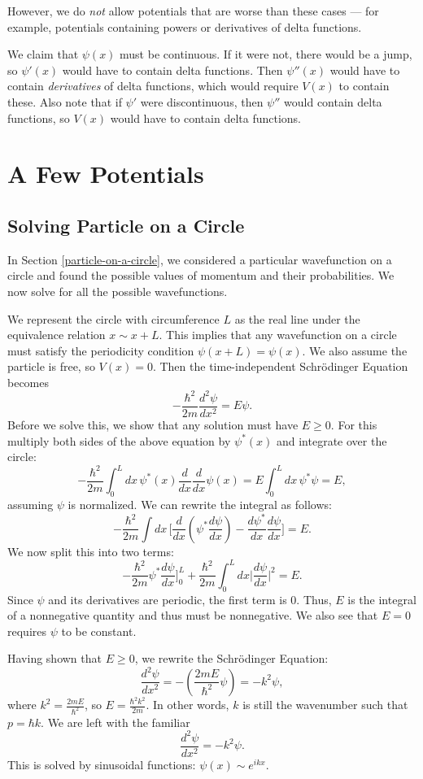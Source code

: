 However, we do \textit{not} allow potentials that are worse than these cases --- for example, potentials containing powers or derivatives of delta functions.

We claim that $\psi(x)$ must be continuous. If it were not, there would be a jump, so $\psi'(x)$ would have to contain delta functions. Then $\psi''(x)$ would have to contain \textit{derivatives} of delta functions, which would require $V(x)$ to contain these. Also note that if $\psi'$ were discontinuous, then $\psi''$ would contain delta functions, so $V(x)$ would have to contain delta functions. 

\section{A Few Potentials}
\subsection{Solving Particle on a Circle}\label{solving_particle_on_circle}

In Section \ref{particle-on-a-circle}, we considered a particular wavefunction on a circle and found the possible values of momentum and their probabilities. We now solve for all the possible wavefunctions.

We represent the circle with circumference $L$ as the real line under the equivalence relation $x\sim x+L$. This implies that any wavefunction on a circle must satisfy the periodicity condition $\psi(x+L)=\psi(x)$. We also assume the particle is free, so $V(x)=0$. Then the time-independent Schrödinger Equation becomes $$-\frac{\hbar^2}{2m}\frac{d^2\psi}{dx^2}=E\psi.$$Before we solve this, we show that any solution must have $E\geq 0$. For this multiply both sides of the above equation by $\psi^*(x)$ and integrate over the circle:$$-\frac{\hbar^2}{2m}\int_0^L dx\,\psi^*(x)\frac{d}{dx}\frac{d}{dx}\psi(x)=E\int_0^L dx\,\psi^*\psi=E,$$assuming $\psi$ is normalized. We can rewrite the integral as follows: $$-\frac{\hbar^2}{2m}\int dx\,\bigg[\frac{d}{dx}(\psi^*\frac{d\psi}{dx})-\frac{d\psi^*}{dx}\frac{d\psi}{dx}\bigg]=E.$$We now split this into two terms: $$-\frac{\hbar^2}{2m}\psi^*\frac{d\psi}{dx}\bigg]_0^L+\frac{\hbar^2}{2m}\int_0^L dx\bigg|\frac{d\psi}{dx}\bigg|^2=E.$$Since $\psi$ and its derivatives are periodic, the first term is $0$. Thus, $E$ is the integral of a nonnegative quantity and thus must be nonnegative. We also see that $E=0$ requires $\psi$ to be constant.

Having shown that $E\geq 0$, we rewrite the Schrödinger Equation: $$\frac{d^2\psi}{dx^2}=-(\frac{2mE}{\hbar^2}\psi)=-k^2\psi,$$where $k^2=\frac{2mE}{\hbar^2}$, so $E=\frac{\hbar^2k^2}{2m}$. In other words, $k$ is still the wavenumber such that $p=\hbar k$. We are left with the familiar $$\frac{d^2\psi}{dx^2}=-k^2\psi.$$This is solved by sinusoidal functions: $\psi(x)\sim e^{ikx}$.

